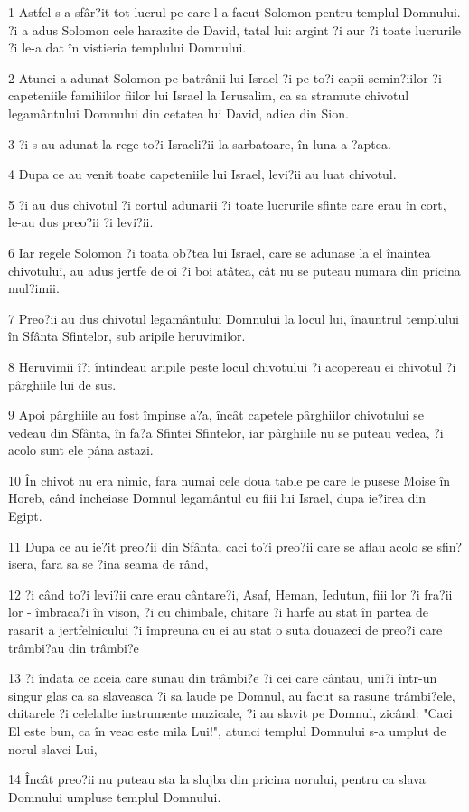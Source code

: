 \par 1 Astfel s-a sfâr?it tot lucrul pe care l-a facut Solomon pentru templul Domnului. ?i a adus Solomon cele harazite de David, tatal lui: argint ?i aur ?i toate lucrurile ?i le-a dat în vistieria templului Domnului.
\par 2 Atunci a adunat Solomon pe batrânii lui Israel ?i pe to?i capii semin?iilor ?i capeteniile familiilor fiilor lui Israel la Ierusalim, ca sa stramute chivotul legamântului Domnului din cetatea lui David, adica din Sion.
\par 3 ?i s-au adunat la rege to?i Israeli?ii la sarbatoare, în luna a ?aptea.
\par 4 Dupa ce au venit toate capeteniile lui Israel, levi?ii au luat chivotul.
\par 5 ?i au dus chivotul ?i cortul adunarii ?i toate lucrurile sfinte care erau în cort, le-au dus preo?ii ?i levi?ii.
\par 6 Iar regele Solomon ?i toata ob?tea lui Israel, care se adunase la el înaintea chivotului, au adus jertfe de oi ?i boi atâtea, cât nu se puteau numara din pricina mul?imii.
\par 7 Preo?ii au dus chivotul legamântului Domnului la locul lui, înauntrul templului în Sfânta Sfintelor, sub aripile heruvimilor.
\par 8 Heruvimii î?i întindeau aripile peste locul chivotului ?i acopereau ei chivotul ?i pârghiile lui de sus.
\par 9 Apoi pârghiile au fost împinse a?a, încât capetele pârghiilor chivotului se vedeau din Sfânta, în fa?a Sfintei Sfintelor, iar pârghiile nu se puteau vedea, ?i acolo sunt ele pâna astazi.
\par 10 În chivot nu era nimic, fara numai cele doua table pe care le pusese Moise în Horeb, când încheiase Domnul legamântul cu fiii lui Israel, dupa ie?irea din Egipt.
\par 11 Dupa ce au ie?it preo?ii din Sfânta, caci to?i preo?ii care se aflau acolo se sfin?isera, fara sa se ?ina seama de rând,
\par 12 ?i când to?i levi?ii care erau cântare?i, Asaf, Heman, Iedutun, fiii lor ?i fra?ii lor - îmbraca?i în vison, ?i cu chimbale, chitare ?i harfe au stat în partea de rasarit a jertfelnicului ?i împreuna cu ei au stat o suta douazeci de preo?i care trâmbi?au din trâmbi?e
\par 13 ?i îndata ce aceia care sunau din trâmbi?e ?i cei care cântau, uni?i într-un singur glas ca sa slaveasca ?i sa laude pe Domnul, au facut sa rasune trâmbi?ele, chitarele ?i celelalte instrumente muzicale, ?i au slavit pe Domnul, zicând: "Caci El este bun, ca în veac este mila Lui!", atunci templul Domnului s-a umplut de norul slavei Lui,
\par 14 Încât preo?ii nu puteau sta la slujba din pricina norului, pentru ca slava Domnului umpluse templul Domnului.

